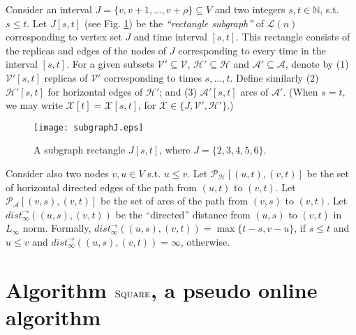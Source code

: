 \documentclass[11pt]{article}
\newcommand{\calX}{\mathcal{X}}
\newcommand{\calL}{\mathcal{L}}
\newcommand{\calV}{\mathcal{V}}
\newcommand{\calH}{\mathcal{H}}
\newcommand{\calA}{\mathcal{A}}
\newcommand{\calP}{\mathcal{P}}
\newcommand{\naturals}{\mathbb{N}}
\newcommand{\Square}[0]{\mbox{\sc Square}}
\newcommand{\rep}[2]{(#1,#2)}
\newcommand{\nn}{n}
\newcommand{\distinf}[1]{{dist}^{\rightarrow}_{\infty}(#1)}
\begin{document}
Consider an interval $J=\{v,v+1,...,v+\rho\}\subseteq V$
and two integers $s,t\in\naturals$, s.t. $s\leq t$.
Let $J[s,t]$ (see Fig. \ref{figure:subgraphJ}) be the
{\em ``rectangle subgraph''} of $\calL(\nn)$ corresponding to vertex set $J$ and time interval $[s,t]$.
This rectangle consists of the
replicas and edges of the nodes of $J$ corresponding to every time in the interval $[s,t]$.
For a given subsets $\calV'\subseteq \calV$, $\calH'\subseteq\calH$ and $\calA'\subseteq\calA$,
denote by
(1) $\calV'[s,t]$ replicas of $\calV'$ corresponding to times
 $s,...,t$. Define similarly (2) $\calH'[s,t]$ for horizontal edges of $\calH'$; and (3) $\calA'[s,t]$ arcs of $\calA'$.
(When $s=t$, we may write
$\calX[t]=\calX[s,t]$, for $\calX\in\{J,\calV',\calH'\}$.)
\begin{figure}[http!]
\begin{center}
\texttt{[image: subgraphJ.eps]}
\end{center}
\caption{\sf \label{figure:subgraphJ}
A subgraph rectangle $J[s,t]$, where $J=\{2,3,4,5,6\}$.}
\end{figure}
Consider also two nodes $v,u\in V$ s.t. $u\leq v$.
Let $\calP_\calH[\rep{u}{t},\rep{v}{t}]$
be the set of horizontal directed edges of the  path from $\rep{u}{t}$ to $\rep{v}{t}$.
Let $\calP_\calA[\rep{v}{s},\rep{v}{t}]$ be the set of arcs
of the path from $\rep{v}{s}$ to $\rep{v}{t}$.
Let $\distinf{\rep{u}{s},\rep{v}{t}}$ be the ``directed'' distance from $\rep{u}{s}$ to $\rep{v}{t}$ in $L_{\infty}$ norm.
Formally, $\distinf{\rep{u}{s},\rep{v}{t}}=\max\{t-s, v-u\}$, if $s\leq t$ and $u\leq v$ and $\distinf{\rep{u}{s},\rep{v}{t}}=\infty$, otherwise.



\vspace{-0.0cm}


\vspace{-0.3cm}
\section{Algorithm $\Square$, a pseudo online algorithm}
\label{sec:square}
\end{document}
